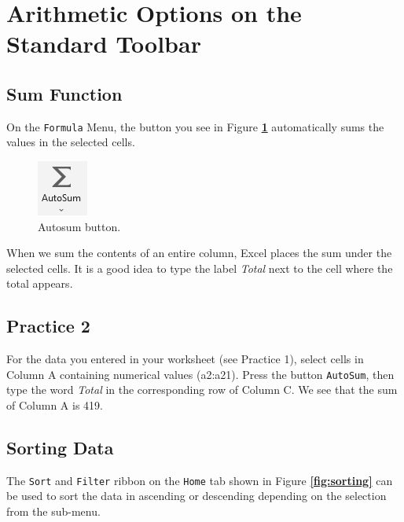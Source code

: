 \documentclass[
]{book}
\begin{document}
\hypertarget{arithmetic-options-on-the-standard-toolbar}{%
\section{Arithmetic Options on the Standard Toolbar}\label{arithmetic-options-on-the-standard-toolbar}}

\hypertarget{sum-function}{%
\subsection{Sum Function}\label{sum-function}}

On the \texttt{Formula} Menu, the button you see in Figure \textbf{\ref{fig:autosum}} automatically sums the values in the selected cells.

\begin{figure}

{\centering \includegraphics[width=0.1\linewidth]{autosum} 

}

\caption{Autosum button.}\label{fig:autosum}
\end{figure}

When we sum the contents of an entire column, Excel places the sum under the selected cells. It is a good idea to type the label \emph{Total} next to the cell where the total appears.

\hypertarget{practice-2}{%
\subsection{Practice 2}\label{practice-2}}

For the data you entered in your worksheet (see Practice 1), select cells in Column A containing numerical values (a2:a21). Press the button \texttt{AutoSum}, then type the word \emph{Total} in the corresponding row of Column C. We see that the sum of Column A is 419.

\hypertarget{sorting-data}{%
\subsection{Sorting Data}\label{sorting-data}}

The \texttt{Sort} and \texttt{Filter} ribbon on the \texttt{Home} tab shown in Figure \textbf{\ref{fig:sorting}} can be used to sort the data in ascending or descending depending on the selection from the sub-menu.
\end{document}
